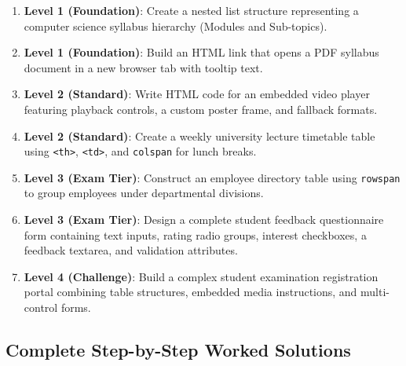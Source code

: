 \begin{practiceset}
\begin{enumerate}[leftmargin=1.5em]
    \item \textbf{Level 1 (Foundation)}: Create a nested list structure representing a computer science syllabus hierarchy (Modules and Sub-topics).
    \item \textbf{Level 1 (Foundation)}: Build an HTML link that opens a PDF syllabus document in a new browser tab with tooltip text.
    \item \textbf{Level 2 (Standard)}: Write HTML code for an embedded video player featuring playback controls, a custom poster frame, and fallback formats.
    \item \textbf{Level 2 (Standard)}: Create a weekly university lecture timetable table using \texttt{<th>}, \texttt{<td>}, and \texttt{colspan} for lunch breaks.
    \item \textbf{Level 3 (Exam Tier)}: Construct an employee directory table using \texttt{rowspan} to group employees under departmental divisions.
    \item \textbf{Level 3 (Exam Tier)}: Design a complete student feedback questionnaire form containing text inputs, rating radio groups, interest checkboxes, a feedback textarea, and validation attributes.
    \item \textbf{Level 4 (Challenge)}: Build a complex student examination registration portal combining table structures, embedded media instructions, and multi-control forms.
\end{enumerate}
\end{practiceset}

\subsection{Complete Step-by-Step Worked Solutions}

